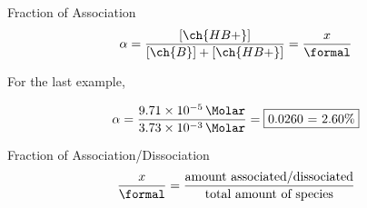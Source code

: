 \documentclass[handout]{beamer}
\begin{document}
\begin{frame}{Fraction of Association}
	\begin{align*}
		\alpha = \frac{[\ch{HB+}]}{[\ch{B}] + [\ch{HB+}]} =
		\dfrac{x}{\si{\formal}}
	\end{align*}

	For the last example,

	\begin{align*}
		\alpha =
		\frac{\SI{9.71e-5}{\Molar}}{\SI{3.73e-3}{\Molar}} =
		\fbox{0.0260 = 2.60\%}
	\end{align*}

	\begin{block}{Fraction of Association/Dissociation}
		\begin{align*}
			\frac{x}{\si{\formal}} = \frac{\text{amount
			associated/dissociated}}{\text{total amount of species}}
		\end{align*}
	\end{block}
\end{frame}


\clearpage

%
%

%
%
%
%
%
\end{document}
